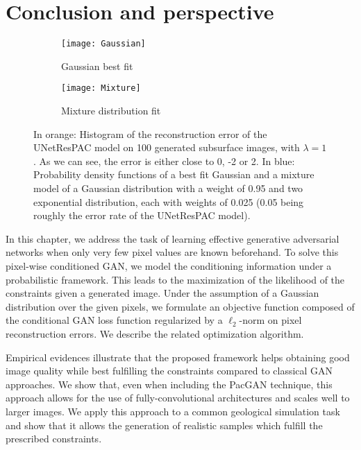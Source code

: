 \section{Conclusion and perspective}

\begin{figure}[!t]
	
	\begin{subfigure}[t]{0.5\textwidth}
		\centering
		\texttt{[image: Gaussian]}
		\caption{Gaussian best fit}
		\label{fig:rec_error}
	\end{subfigure}\begin{subfigure}[t]{0.5\textwidth}
		\centering
		\texttt{[image: Mixture]}
		\caption{Mixture distribution fit}
		\label{fig:mixture_dist}
	\end{subfigure}	
	\caption[Better modeling of the reconstruction error on the Subsurface dataset]{In orange: Histogram of the reconstruction error of the UNetResPAC model on 100 generated subsurface images, with $\lambda = 1$. As we can see, the error is either close to 0, -2 or 2. In blue: Probability density functions of a best fit Gaussian and a mixture model of a Gaussian distribution with a weight of 0.95 and two exponential distribution, each with weights of 0.025 (0.05 being roughly the error rate of the UNetResPAC model).}
\end{figure}

In this chapter, we address the task of learning effective generative adversarial networks when only very few pixel values are known beforehand. To solve this pixel-wise conditioned GAN, we model the conditioning information under a probabilistic framework. This leads to the maximization of the likelihood of the constraints given a
generated image. Under the assumption of a Gaussian distribution over the given pixels, we formulate an objective function composed of the conditional GAN loss function regularized by a $\ell_2$-norm on pixel reconstruction errors. We describe the related optimization algorithm.

Empirical evidences illustrate that the proposed framework helps obtaining good image quality while best fulfilling the constraints compared to classical GAN approaches. We show that, even when including the PacGAN technique,  this approach  allows for the use of fully-convolutional architectures and scales well to larger images. We apply this approach to a common geological simulation task and show that it allows the generation of realistic samples which fulfill the prescribed constraints.


